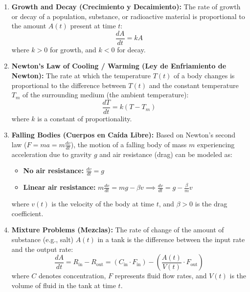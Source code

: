 \documentclass[11pt,letterpaper]{article}
\begin{document}
\begin{enumerate}
    \item \textbf{Growth and Decay (Crecimiento y Decaimiento):}
    The rate of growth or decay of a population, substance, or radioactive material is proportional to the amount $A(t)$ present at time $t$:
    \begin{equation}
        \frac{dA}{dt} = kA
    \end{equation}
    where $k > 0$ for growth, and $k < 0$ for decay.

    \item \textbf{Newton's Law of Cooling / Warming (Ley de Enfriamiento de Newton):}
    The rate at which the temperature $T(t)$ of a body changes is proportional to the difference between $T(t)$ and the constant temperature $T_m$ of the surrounding medium (the ambient temperature):
    \begin{equation}
        \frac{dT}{dt} = k(T - T_m)
    \end{equation}
    where $k$ is a constant of proportionality.

    \item \textbf{Falling Bodies (Cuerpos en Caída Libre):}
    Based on Newton's second law ($F = ma = m \frac{dv}{dt}$), the motion of a falling body of mass $m$ experiencing acceleration due to gravity $g$ and air resistance (drag) can be modeled as:
    \begin{itemize}
        \item \textbf{No air resistance:} $\frac{dv}{dt} = g$
        \item \textbf{Linear air resistance:} $m \frac{dv}{dt} = mg - \beta v \implies \frac{dv}{dt} = g - \frac{\beta}{m} v$
    \end{itemize}
    where $v(t)$ is the velocity of the body at time $t$, and $\beta > 0$ is the drag coefficient.

    \item \textbf{Mixture Problems (Mezclas):}
    The rate of change of the amount of substance (e.g., salt) $A(t)$ in a tank is the difference between the input rate and the output rate:
    \begin{equation}
        \frac{dA}{dt} = R_{\text{in}} - R_{\text{out}} = (C_{\text{in}} \cdot F_{\text{in}}) - \left(\frac{A(t)}{V(t)} \cdot F_{\text{out}}\right)
    \end{equation}
    where $C$ denotes concentration, $F$ represents fluid flow rates, and $V(t)$ is the volume of fluid in the tank at time $t$.
\end{enumerate}
\end{document}
